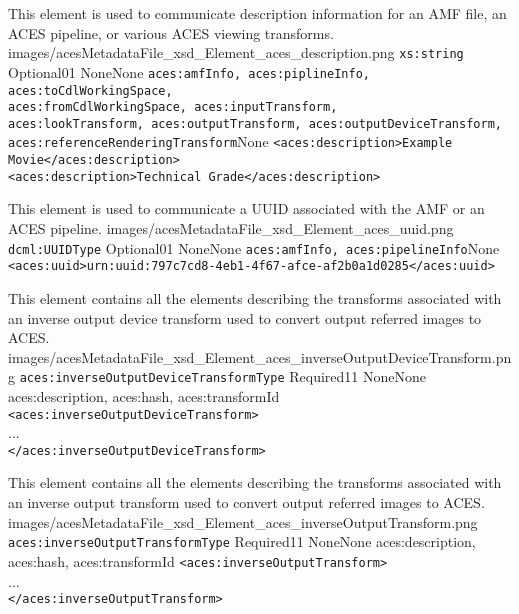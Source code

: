 		{This element is used to communicate description information for an AMF file, an ACES pipeline, or various ACES viewing transforms.}
		{images/acesMetadataFile_xsd_Element_aces_description.png}
		{\texttt{xs:string}}
		{Optional}{0}{1}
		{None}{None}
		{\texttt{aces:amfInfo, aces:piplineInfo, aces:toCdlWorkingSpace,\\ aces:fromCdlWorkingSpace, aces:inputTransform,\\ 
		  aces:lookTransform, aces:outputTransform, aces:outputDeviceTransform, \\
		  aces:referenceRenderingTransform}}{None}
		{\lstinline{<aces:description>Example Movie</aces:description>}\\
		 \lstinline{<aces:description>Technical Grade</aces:description>}}   

		{This element is used to communicate a UUID associated with the AMF or an ACES pipeline.}
		{images/acesMetadataFile_xsd_Element_aces_uuid.png}
		{\texttt{dcml:UUIDType}}
		{Optional}{0}{1}
		{None}{None}
		{\texttt{aces:amfInfo, aces:pipelineInfo}}{None}
		{\lstinline{<aces:uuid>urn:uuid:797c7cd8-4eb1-4f67-afce-af2b0a1d0285</aces:uuid>}} 

        {This element contains all the elements describing the transforms associated with an inverse output device transform used to convert output referred images to ACES.}
        {images/acesMetadataFile_xsd_Element_aces_inverseOutputDeviceTransform.png}
        {\texttt{aces:inverseOutputDeviceTransformType}}
        {Required}{1}{1}
        {None}{None}
        {aces:description, aces:hash, aces:transformId}
        {\lstinline{<aces:inverseOutputDeviceTransform>} \\
        ... \\
        \lstinline{</aces:inverseOutputDeviceTransform>}}
        
        {This element contains all the elements describing the transforms associated with an inverse output  transform used to convert output referred images to ACES.}
        {images/acesMetadataFile_xsd_Element_aces_inverseOutputTransform.png}
        {\texttt{aces:inverseOutputTransformType}}
        {Required}{1}{1}
        {None}{None}
        {aces:description, aces:hash, aces:transformId}
        {\lstinline{<aces:inverseOutputTransform>} \\
        ... \\
        \lstinline{</aces:inverseOutputTransform>}}
        
